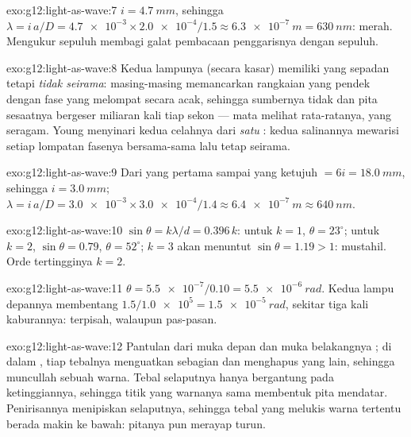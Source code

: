 \begin{solution}{exo:g12:light-as-wave:7}
$i = \qty{4.7}{mm}$, sehingga $\lambda = i\,a/D = \num{4.7e-3} \times
\num{2.0e-4}/1.5 \approx \qty{6.3e-7}{m} = \qty{630}{nm}$: merah.
Mengukur sepuluh  membagi galat pembacaan penggarisnya
dengan sepuluh.
\end{solution}

\begin{solution}{exo:g12:light-as-wave:8}
Kedua lampunya (secara kasar) memiliki  yang sepadan tetapi
\emph{tidak seirama}: masing-masing memancarkan rangkaian  yang
pendek dengan fase yang melompat secara acak, sehingga sumbernya tidak
 dan pita sesaatnya bergeser miliaran kali tiap sekon --- mata
melihat rata-ratanya, yang seragam. Young menyinari kedua celahnya dari
\emph{satu} : kedua salinannya mewarisi setiap lompatan fasenya
bersama-sama lalu tetap seirama.
\end{solution}

\begin{solution}{exo:g12:light-as-wave:9}
Dari yang pertama sampai yang ketujuh $= 6i = \qty{18.0}{mm}$, sehingga
$i = \qty{3.0}{mm}$;
$\lambda = i\,a/D = \num{3.0e-3} \times \num{3.0e-4}/1.4 \approx
\qty{6.4e-7}{m} \approx \qty{640}{nm}$.
\end{solution}

\begin{solution}{exo:g12:light-as-wave:10}
$\sin\theta = k\lambda/d = 0.396\,k$: untuk $k = 1$,
$\theta = 23^\circ$; untuk $k = 2$, $\sin\theta = 0.79$,
$\theta = 52^\circ$; $k = 3$ akan menuntut $\sin\theta = 1.19 > 1$:
mustahil. Orde tertingginya $k = 2$.
\end{solution}

\begin{solution}{exo:g12:light-as-wave:11}
$\theta = \num{5.5e-7}/0.10 = \qty{5.5e-6}{rad}$. Kedua lampu depannya
membentang $1.5/\num{1.0e5} = \qty{1.5e-5}{rad}$, sekitar tiga kali
kaburannya: terpisah, walaupun pas-pasan.
\end{solution}

\begin{solution}{exo:g12:light-as-wave:12}
Pantulan dari muka depan dan muka belakangnya ; di dalam
, tiap tebalnya menguatkan sebagian  dan
menghapus yang lain, sehingga muncullah sebuah warna. Tebal selaputnya
hanya bergantung pada ketinggiannya, sehingga titik yang warnanya sama
membentuk pita mendatar. Penirisannya menipiskan selaputnya, sehingga
tebal yang melukis warna tertentu berada makin ke bawah: pitanya pun
merayap turun.
\end{solution}

